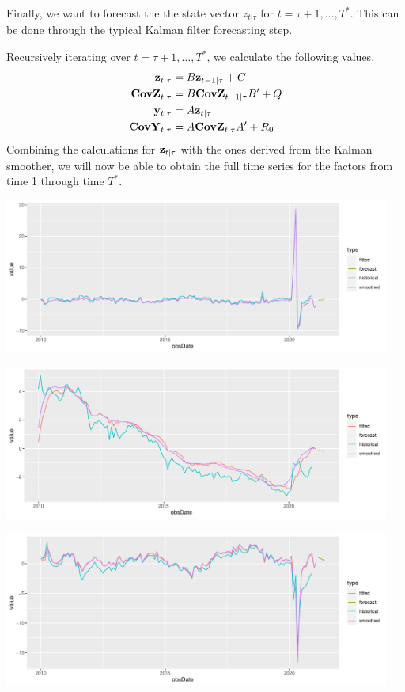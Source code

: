 \documentclass[11pt, letterpaper]{article}\usepackage[]{graphicx}\usepackage[]{color}
\newcommand{\vv}[1]{\textcolor{black}{\mathbf{#1}}}
\begin{document}
Finally, we want to forecast the the state vector $z_{t|\tau}$ for $t = \tau + 1, \dots, T^*$. This can be done through the typical Kalman filter forecasting step.

Recursively iterating over $t = \tau + 1, \dots, T^*$, we calculate the following values.
\begin{align*}
	\vv{z}_{t|\tau} &= B \vv{z}_{t-1|\tau} + C\\
	\vv{CovZ}_{t|\tau} &= B \vv{CovZ}_{t-1|\tau} B'+ Q\\
	\vv{y}_{t|\tau} &= A \vv{z}_{t|\tau}\\
	\vv{CovY}_{t|\tau} &= A \vv{CovZ}_{t|\tau} A' + R_0
\end{align*}
Combining the calculations for $\vv{z}_{t|\tau}$ with the ones derived from the Kalman smoother, we will now be able to obtain the full time series for the factors from time 1 through time $T^*$.



{\centering \includegraphics[width=5in,height=2in]{figure/unnamed-chunk-6-1} 

}




{\centering \includegraphics[width=5in,height=2in]{figure/unnamed-chunk-6-2} 

}




{\centering \includegraphics[width=5in,height=2in]{figure/unnamed-chunk-6-3} 

}
\end{document}
